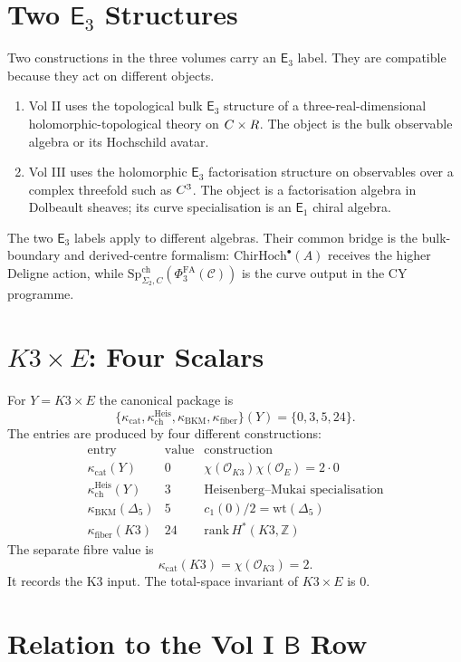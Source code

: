 \documentclass[11pt]{article}
\providecommand{\Eone}{\mathsf{E}_1}
\providecommand{\Ethree}{\mathsf{E}_3}
\providecommand{\cC}{\mathcal{C}}
\providecommand{\cO}{\mathcal{O}}
\providecommand{\ChirHoch}{\mathrm{ChirHoch}}
\providecommand{\SpCh}{\mathrm{Sp}^{\mathrm{ch}}}
\providecommand{\PhiFA}{\Phi^{\mathrm{FA}}}
\providecommand{\kch}{\kappa_{\mathrm{ch}}}
\providecommand{\kcat}{\kappa_{\mathrm{cat}}}
\providecommand{\kBKM}{\kappa_{\mathrm{BKM}}}
\providecommand{\kfib}{\kappa_{\mathrm{fiber}}}
\begin{document}
\section{Two $\Ethree$ Structures}
\label{sec:e3}

Two constructions in the three volumes carry an $\Ethree$ label.
They are compatible because they act on different objects.

\begin{enumerate}[label=\textup{(\roman*)}]
\item Vol II uses the topological bulk $\Ethree$ structure of a
three-real-dimensional holomorphic-topological theory on $C\times R$.
The object is the bulk observable algebra or its Hochschild avatar.
\item Vol III uses the holomorphic $\Ethree$ factorisation structure on
observables over a complex threefold such as $C^3$. The object is a
factorisation algebra in Dolbeault sheaves; its curve specialisation is
an $\Eone$ chiral algebra.
\end{enumerate}

The two $\Ethree$ labels apply to different algebras. Their common
bridge is the bulk-boundary and derived-centre formalism:
$\ChirHoch^\bullet(A)$ receives the higher Deligne action, while
$\SpCh_{\Sigma_2,C}(\PhiFA_3(\cC))$ is the curve output in the CY
programme.

\section{$K3\times E$: Four Scalars}
\label{sec:k3e}

For $Y=K3\times E$ the canonical package is
\[
 \{\kcat,\kch^{\mathrm{Heis}},\kBKM,\kfib\}(Y)=\{0,3,5,24\}.
\]
The entries are produced by four different constructions:
\[
\begin{array}{c|c|l}
\text{entry} & \text{value} & \text{construction}\\
\hline
\kcat(Y) & 0 &
\chi(\cO_{K3})\chi(\cO_E)=2\cdot 0\\
\kch^{\mathrm{Heis}}(Y) & 3 &
\text{Heisenberg--Mukai specialisation}\\
\kBKM(\Delta_5) & 5 &
c_1(0)/2=\mathrm{wt}(\Delta_5)\\
\kfib(K3) & 24 &
\mathrm{rank}\,H^\ast(K3,\mathbb Z)
\end{array}
\]
The separate fibre value is
\[
 \kcat(K3)=\chi(\cO_{K3})=2.
\]
It records the K3 input. The total-space invariant of $K3\times E$ is
$0$.

\section{Relation to the Vol I $\mathsf B$ Row}
\label{sec:b-row}
\end{document}
